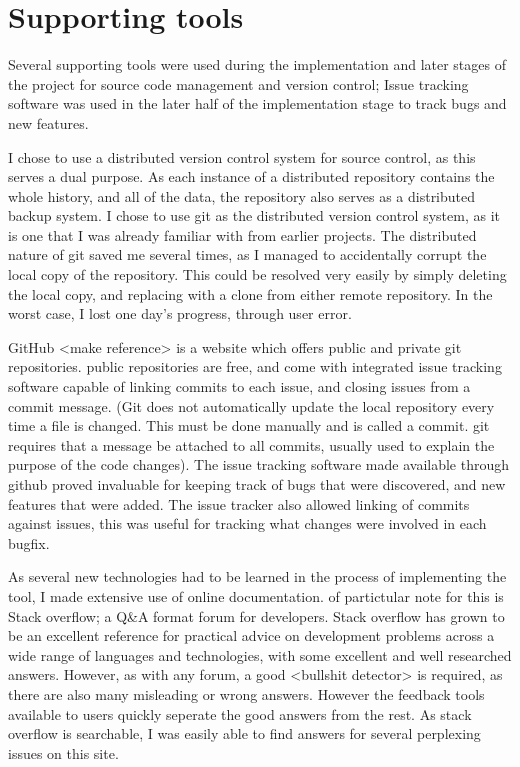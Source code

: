 \section{Supporting tools}
Several supporting tools were used during the implementation and later stages of the project for source code management and version control; Issue tracking software was used in the later half of the implementation stage to track bugs and new features.

I chose to use a distributed version control system for source control, as this serves a dual purpose. As each instance of a distributed repository contains the whole history, and all of the data, the repository also serves as a distributed backup system. 
I chose to use git as the distributed version control system, as it is one that I was already familiar with from earlier projects. The distributed nature of git saved me several times, as I managed to accidentally corrupt the local copy of the repository. This could be resolved very easily by simply deleting the local copy, and replacing with a clone from either remote repository. In the worst case, I lost one day's progress, through user error.

GitHub <make reference> is a website which offers public and private git repositories. public repositories are free, and come with integrated issue tracking software capable of linking commits to each issue, and closing issues from a commit message. (Git does not automatically update the local repository every time a file is changed. This must be done manually and is called a commit. git requires that a message be attached to all commits, usually used to explain the purpose of the code changes). The issue tracking software made available through github proved invaluable for keeping track of bugs that were discovered, and new features that were added. The issue tracker also allowed linking of commits against issues, this was useful for tracking what changes were involved in each bugfix.

As several new technologies had to be learned in the process of implementing the tool, I made extensive use of online documentation. of partictular note for this is Stack overflow; a  Q\&A format forum for developers. Stack overflow has grown to be an excellent reference for practical advice on development problems across a wide range of languages and technologies, with some excellent and well researched answers. However, as with any forum, a good <bullshit detector> is required, as there are also many misleading or wrong answers. However the feedback tools available to users quickly seperate the good answers from the rest. As stack overflow is searchable, I was easily able to find answers for several perplexing issues on this site. 